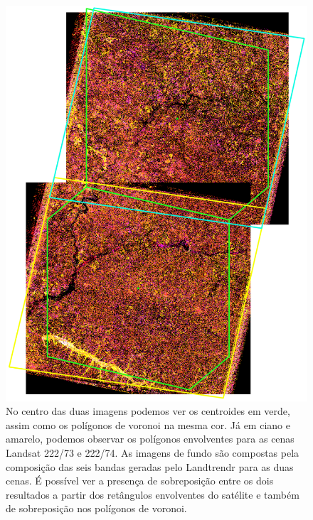 \begin{figure}[H]
    \centering
    \includegraphics[scale=.5]{images/voronoi_example.pdf}
    \caption{No centro das duas imagens podemos ver os centroides em verde, assim como os polígonos de voronoi na mesma cor. Já em ciano e amarelo, podemos observar os polígonos envolventes para as cenas Landsat 222/73 e 222/74. As imagens de fundo são compostas pela composição das seis bandas geradas pelo Landtrendr para as duas cenas. É possível ver a presença de sobreposição entre os dois resultados a partir dos retângulos envolventes do satélite e também de sobreposição nos polígonos de voronoi.}
    \label{fig:voronoi_example}
\end{figure}

